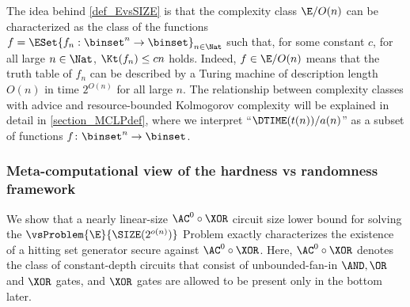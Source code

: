 \documentclass{toc}
\begin{document}
The idea behind \cref{def_EvsSIZE} is that
the complexity class $\E / O(n)$ can be characterized as
the class of the functions $f = \ESet{f_n : \binset^n \to \binset}_{n\in\Nat}$
such that,
for some constant $c$, for all large $n \in \Nat$,
$\Kt(f_n) \le c n$ holds.
Indeed, $f \in \E / O(n)$ means that the truth table of $f_n$ can be described by a Turing machine of description length $O(n)$ in time $2^{O(n)}$ for all large $n$.
%
The relationship between complexity classes with advice and resource-bounded Kolmogorov complexity
will be explained in detail in \cref{section_MCLPdef},
where we interpret ``$\DTIME(t(n))/a(n)$'' as a subset of functions $f \colon \binset^n \to \binset$.
%


\subsubsection{Meta-computational view of the hardness vs randomness framework}
%
%
We show that a nearly linear-size $\AC^0 \circ \XOR$ circuit size lower bound for
solving the $\vsProblem{\E}{\SIZE(2^{o(n)})}$ Problem
exactly characterizes
the existence of a hitting set generator secure against $\AC^0 \circ \XOR$.
%
%
Here, $\AC^0 \circ \XOR$ denotes the class of constant-depth circuits that consist of unbounded-fan-in $\AND, \OR$ and $\XOR$ gates, and $\XOR$ gates are allowed to be present only in the bottom later.
\end{document}
